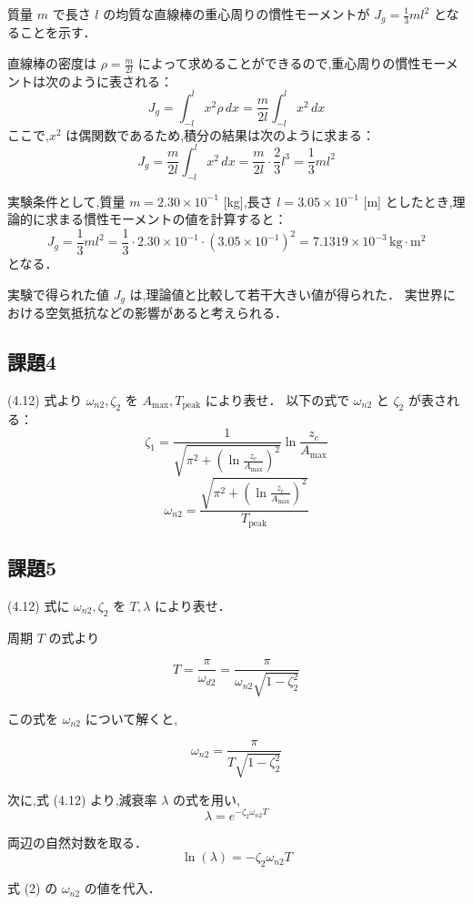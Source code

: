 質量 \(m\) で長さ \(l\) の均質な直線棒の重心周りの慣性モーメントが \(J_g = \frac{1}{3}ml^2\) となることを示す．

直線棒の密度は \(\rho = \frac{m}{2l}\) によって求めることができるので,重心周りの慣性モーメントは次のように表される：
\[
  J_g = \int_{-l}^{l} x^2 \rho \, dx = \frac{m}{2l} \int_{-l}^{l} x^2 \, dx
\]
ここで,\(x^2\) は偶関数であるため,積分の結果は次のように求まる：
\[
  J_g = \frac{m}{2l} \int_{-l}^{l} x^2 \, dx = \frac{m}{2l} \cdot \frac{2}{3} l^3 = \frac{1}{3} ml^2
\]

実験条件として,質量 \(m = 2.30 \times 10^{-1}\) [kg],長さ \(l = 3.05 \times 10^{-1}\) [m] としたとき,理論的に求まる慣性モーメントの値を計算すると：
\[
  J_g = \frac{1}{3}ml^2 = \frac{1}{3} \cdot 2.30 \times 10^{-1} \cdot (3.05 \times 10^{-1})^2 = 7.1319 \times 10^{-3} \, \text{kg} \cdot \text{m}^2
\]
となる．

実験で得られた値 \(J_g\) は,理論値と比較して若干大きい値が得られた．
実世界における空気抵抗などの影響があると考えられる．

\subsection*{課題4}
(4.12) 式より $\omega_{n2}, \zeta_2$ を $A_{\max}, T_{\text{peak}}$ により表せ．
以下の式で $\omega_{n2}$ と $\zeta_2$ が表される：
\[
  \zeta_1 = \frac{1}{\sqrt{\pi^2 + \left( \ln \frac{z_c}{A_{\max}} \right)^2}} \ln \frac{z_c}{A_{\max}}
\]
\[
  \omega_{n2} = \frac{\sqrt{\pi^2 + \left( \ln \frac{z_c}{A_{\max}} \right)^2}}{T_{\text{peak}}}
\]

\subsection*{課題5}
(4.12) 式に $\omega_{n2}, \zeta_2$ を $T, \lambda$ により表せ．

周期 \(T\) の式より

\[
  T = \frac{\pi}{\omega_{d2}} = \frac{\pi}{\omega_{n2} \sqrt{1 - \zeta_2^2}} \tag{1}
\]

この式を \(\omega_{n2}\) について解くと,

\[
  \omega_{n2} = \frac{\pi}{T \sqrt{1 - \zeta_2^2}} \tag{2}
\]

次に,式 (4.12) より,減衰率 \(\lambda\) の式を用い,
\[
  \lambda = e^{-\zeta_2 \omega_{n2} T} \tag{3}
\]

両辺の自然対数を取る．
\[
  \ln(\lambda) = -\zeta_2 \omega_{n2} T \tag{4}
\]

式 (2) の \(\omega_{n2}\) の値を代入．

